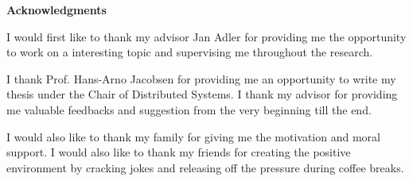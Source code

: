 \clearemptydoublepage
{}
{}	



\vspace*{2cm}

\begin{center}
{\Large \bf Acknowledgments}
\end{center}

\vspace{1cm}

I would first like to thank my advisor Jan Adler for providing me the opportunity to work on a interesting topic and supervising me throughout the research. 
\newline

I thank Prof. Hans-Arno Jacobsen for providing me an opportunity to write my thesis under the Chair of Distributed Systems. I thank my advisor for providing me valuable feedbacks and suggestion from the very beginning till the end.
\newline

I would also like to thank my family for giving me the motivation and moral support. I would also like to thank my friends for creating the positive environment by cracking jokes and releasing off the pressure during coffee breaks.
